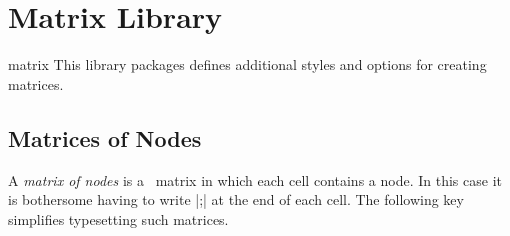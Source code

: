 %
%
%


\section{Matrix Library}

\begin{tikzlibrary}{matrix}
  This library packages defines additional styles and options for
  creating matrices.
\end{tikzlibrary}


\subsection{Matrices of Nodes}

A \emph{matrix of nodes} is a \tikzname\ matrix in which each cell
contains a node. In this case it is bothersome having to write
|;| at the end of each
cell. The following key simplifies typesetting such matrices.

